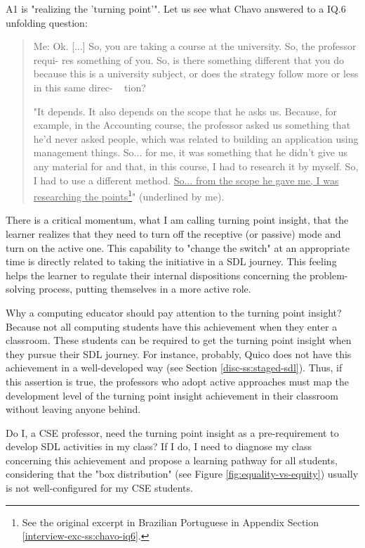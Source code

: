 \gls{A}1 is "realizing the 'turning point'". Let us see what Chavo answered to a \gls{IQ}.6 unfolding question:
\begin{quote}
    \colorbox{black!15}{Me: Ok. [...] So, you are taking a course at the university. So, the professor requi-}
    \colorbox{black!15}{res something of you. So, is there something different that you do because this is} \colorbox{black!15}{a university subject, or does the strategy follow more or less in this same direc-} \mbox{   } \colorbox{black!15}{tion?}
    
    "It depends. It also depends on the scope that he asks us. Because, for example, in the Accounting course, the professor asked us something that he'd never asked people, which was related to building an application using management things. So... for me, it was something that he didn't give us any material for and that, in this course, I had to research it by myself. So, I had to use a different method. \underline{So... from the scope he gave me, I was researching the points}\footnote{See the original excerpt in Brazilian Portuguese in Appendix Section \ref{interview-exc-ss:chavo-iq6}.}" (underlined by me).
\end{quote}

There is a critical momentum, what I am calling turning point insight, that the learner realizes that they need to turn off the receptive (or passive) mode and turn on the active one. This capability to "change the switch" at an appropriate time is directly related to taking the initiative in a \gls{SDL} journey. This feeling helps the learner to regulate their internal dispositions concerning the problem-solving process, putting themselves in a more active role.

Why a computing educator should pay attention to the turning point insight? Because not all computing students have this achievement when they enter a classroom. These students can be required to get the turning point insight when they pursue their \gls{SDL} journey. For instance, probably, Quico does not have this achievement in a well-developed way (see Section \ref{disc-ss:staged-sdl}). Thus, if this assertion is true, the professors who adopt active approaches must map the development level of the turning point insight achievement in their classroom without leaving anyone behind.

Do I, a \gls{CSE} professor, need the turning point insight as a pre-requirement to develop \gls{SDL} activities in my class? If I do, I need to diagnose my class concerning this achievement and propose a learning pathway for all students, considering that the "box distribution" (see Figure \ref{fig:equality-vs-equity}) usually is not well-configured for my \gls{CSE} students.

